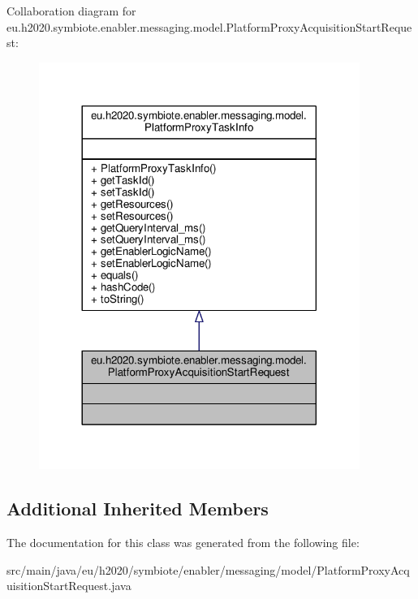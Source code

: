 Collaboration diagram for eu.\+h2020.\+symbiote.\+enabler.\+messaging.\+model.\+Platform\+Proxy\+Acquisition\+Start\+Request\+:\nopagebreak
\begin{figure}[H]
\begin{center}
\leavevmode
\includegraphics[width=296pt]{classeu_1_1h2020_1_1symbiote_1_1enabler_1_1messaging_1_1model_1_1PlatformProxyAcquisitionStartRequest__coll__graph}
\end{center}
\end{figure}
\subsection*{Additional Inherited Members}


The documentation for this class was generated from the following file\+:\begin{DoxyCompactItemize}
\item 
src/main/java/eu/h2020/symbiote/enabler/messaging/model/Platform\+Proxy\+Acquisition\+Start\+Request.\+java\end{DoxyCompactItemize}
